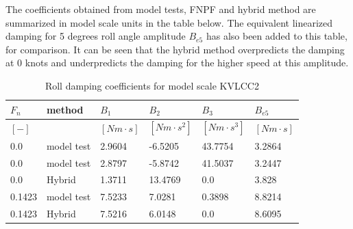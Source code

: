    The coefficients obtained from model tests, FNPF and hybrid method are
summarized in model scale units in the table below. The equivalent
linearized damping for 5 degrees roll angle amplitude $B_{e5}$ has
also been added to this table, for comparison. It can be seen that the
hybrid method overpredicts the damping at 0 knots and underpredicts the
damping for the higher speed at this amplitude.
 
            
    
    
\begin{table}[H]
\scriptsize
\center
\caption{Roll damping coefficients for model scale KVLCC2}
\label{tab:results}
\begin{tabular}{llllll}
\toprule\addlinespace
$F_n$ & method & $B_1$ & $B_2$ & $B_3$ & $B_{e5}$\\ 
\midrule$[-]$ &  & $[Nm \cdot s]$ & $[Nm \cdot s^2]$ & $[Nm \cdot s^3]$ & $[Nm \cdot s]$\\ 
0.0 & model test & 2.9604 & -6.5205 & 43.7754 & 3.2864\\ 
0.0 & model test & 2.8797 & -5.8742 & 41.5037 & 3.2447\\ 
0.0 & Hybrid & 1.3711 & 13.4769 & 0.0 & 3.828\\ 
0.1423 & model test & 7.5233 & 7.0281 & 0.3898 & 8.8214\\ 
0.1423 & Hybrid & 7.5216 & 6.0148 & 0.0 & 8.6095\\ 

\bottomrule
\end{tabular}
\end{table}

    

    